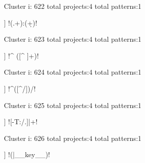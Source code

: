 Cluster i: 622
total projects:4
total patterns:1
\begin{multicols}{1}
\begin{description}[noitemsep,topsep=0pt]
\item [[4] ] \cverb!(.+):(\d+)!
\end{description}
\end{multicols}







Cluster i: 623
total projects:4
total patterns:1
\begin{multicols}{1}
\begin{description}[noitemsep,topsep=0pt]
\item [[4] ] \cverb!^   ([^ ]+)!
\end{description}
\end{multicols}







Cluster i: 624
total projects:4
total patterns:1
\begin{multicols}{1}
\begin{description}[noitemsep,topsep=0pt]
\item [[4] ] \cverb!^([^/])\:/!
\end{description}
\end{multicols}







Cluster i: 625
total projects:4
total patterns:1
\begin{multicols}{1}
\begin{description}[noitemsep,topsep=0pt]
\item [[4] ] \cverb![-T:/.]|\s+!
\end{description}
\end{multicols}







Cluster i: 626
total projects:4
total patterns:1
\begin{multicols}{1}
\begin{description}[noitemsep,topsep=0pt]
\item [[4] ] \cverb!(\*|__key__)!
\end{description}
\end{multicols}








